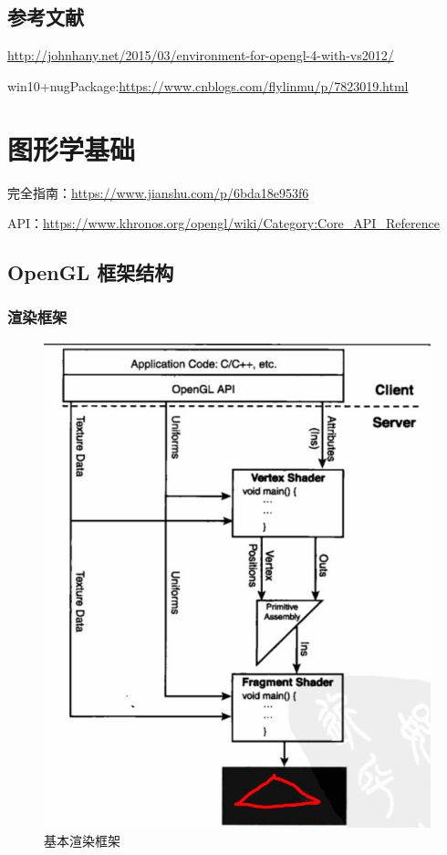 \documentclass[UTF8,a4paper,12pt]{ctexbook}
\begin{document}
    \section{参考文献} 
    \url{http://johnhany.net/2015/03/environment-for-opengl-4-with-vs2012/}    
    
    win10+nugPackage:\url{https://www.cnblogs.com/flylinmu/p/7823019.html}
    


\newpage
\chapter{图形学基础}
	完全指南：\url{https://www.jianshu.com/p/6bda18e953f6}
	
	API：\url{https://www.khronos.org/opengl/wiki/Category:Core_API_Reference}
	
	\section{OpenGL 框架结构}
	
		\subsection{渲染框架}
			\begin{figure}[H]
				\centering
				\includegraphics[width=.91\linewidth]{openGlArch}
				\caption{基本渲染框架}
			\end{figure}
			
\end{document}

